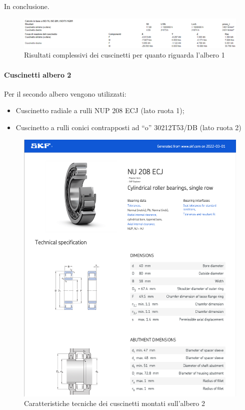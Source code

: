 In conclusione.
\begin{figure}[h]
    \centering
    \includegraphics[scale=0.55]{Immagini/RisultatiCuscinettiAlbero1.png}
    \caption{Risultati complessivi dei cuscinetti per quanto riguarda l'albero 1}
    \label{fig:RisultatiCuscinettiAlbero1}
\end{figure}

\paragraph{Cuscinetti albero 2}
Per il secondo albero vengono utilizzati:
\begin{itemize}
    \item Cuscinetto radiale a rulli NUP 208 ECJ (lato ruota 1);
    \item Cuscinetto a rulli conici contrapposti ad “o” 30212T53/DB (lato ruota 2)
\end{itemize}
\newpage
\begin{figure}[h]
    \centering
    \includegraphics[scale=0.6]{Immagini/Cuscinetti1Albero2.png}
    \caption{Caratteristiche tecniche dei cuscinetti montati sull'albero 2}
    \label{fig:Cuscinetti1Albero1}
\end{figure}
